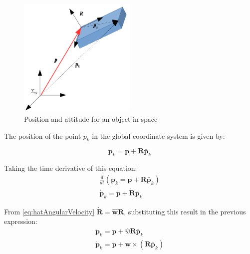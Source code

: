 \documentclass[a4paper]{report}
\begin{document}
\begin{figure}[htb!]
\begin{center}
    \includegraphics[width=0.5\textwidth]{./resources/single_object_velocity.png}
    \caption{Position and attitude for an object in space}
    \label{fig:single_object_velocity}
\end{center}
\end{figure}

The position of the point $p_k$ in the global coordinate system is given by:

\begin{equation*}
    \boldsymbol{p}_k = \boldsymbol{p} + \boldsymbol{R} \bar{\boldsymbol{p}}_k
\end{equation*}

Taking the time derivative of this equation:
\begin{equation}
\begin{split}
    \frac{d}{dt}(\boldsymbol{p}_k = \boldsymbol{p} + \boldsymbol{R} \bar{\boldsymbol{p}}_k) \\
    \boldsymbol{\dot{p}}_k = \boldsymbol{\dot{p}} + \boldsymbol{\dot{R}} \bar{\boldsymbol{p}}_k
\end{split}
\end{equation}

From \eqref{eq:hatAngularVelocity} $\dot{\boldsymbol{R}} = \boldsymbol{\hat{w}}\boldsymbol{R}$,
substituting this result in the previous expression:
\begin{equation}
\begin{split}
    \boldsymbol{\dot{p}}_k = \boldsymbol{\dot{p}} + \hat{w}\boldsymbol{R} \bar{\boldsymbol{p}}_k \\
    \boldsymbol{\dot{p}}_k = \boldsymbol{\dot{p}} + \boldsymbol{w} \times (\boldsymbol{R} \bar{\boldsymbol{p}}_k) \label{eq:singleObjectVelocity}
\end{split}
\end{equation}
\end{document}
